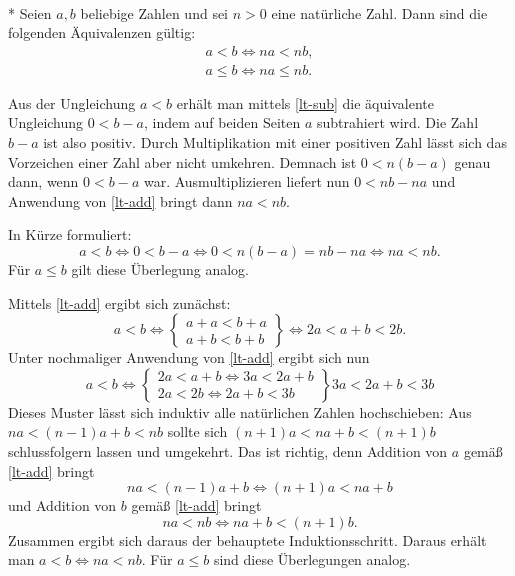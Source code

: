 \begin{Satz}\mbox{}\\*
Seien $a,b$ beliebige Zahlen und sei $n>0$ eine natürliche Zahl.
Dann sind die folgenden Äquivalenzen gültig:
\begin{gather}
\label{lt-mul-nat} a<b\iff na<nb,\\
\label{le-mul-nat} a\le b\iff na\le nb.
\end{gather}
\end{Satz}

\noindent{}
Aus der Ungleichung $a<b$ erhält man mittels \eqref{lt-sub} die
äquivalente Ungleichung $0<b-a$, indem auf beiden Seiten $a$
subtrahiert wird. Die Zahl $b-a$ ist also positiv. Durch Multiplikation
mit einer positiven Zahl lässt sich das Vorzeichen einer Zahl
aber nicht umkehren. Demnach ist $0<n(b-a)$ genau dann,
wenn $0<b-a$ war. Ausmultiplizieren liefert nun
$0<nb-na$ und Anwendung von \eqref{lt-add} bringt dann $na<nb$.

In Kürze formuliert:
\begin{equation}
a<b\iff 0<b-a\iff 0<n(b-a)=nb-na \iff na<nb.
\end{equation}
Für $a\le b$ gilt diese Überlegung analog.\;\qedsymbol

Mittels \eqref{lt-add} ergibt sich zunächst:
\begin{equation}
a<b\iff \left\{
\begin{matrix}
a+a<b+a\\
a+b<b+b
\end{matrix}
\right\}
\iff 2a<a+b<2b.
\end{equation}
Unter nochmaliger Anwendung von \eqref{lt-add} ergibt sich
nun
\begin{equation}
a<b\iff \left\{
\begin{matrix}
2a<a+b \iff 3a<2a+b\\
2a<2b \iff 2a+b<3b
\end{matrix}
\right\} 3a<2a+b<3b
\end{equation}
Dieses Muster lässt sich induktiv alle natürlichen Zahlen hochschieben:
Aus $na<(n-1)a+b<nb$ sollte sich
$(n+1)a<na+b<(n+1)b$ schlussfolgern lassen und umgekehrt.
Das ist richtig, denn Addition von $a$ gemäß \eqref{lt-add} bringt
\begin{equation}
na<(n-1)a+b \iff (n+1)a < na+b
\end{equation}
und Addition von $b$ gemäß \eqref{lt-add} bringt
\begin{equation}
na<nb \iff na+b < (n+1)b.
\end{equation}
Zusammen ergibt sich daraus der behauptete Induktionsschritt. 
Daraus erhält man $a<b\iff na<nb$. Für $a\le b$ sind diese
Überlegungen analog.\;\qedsymbol

